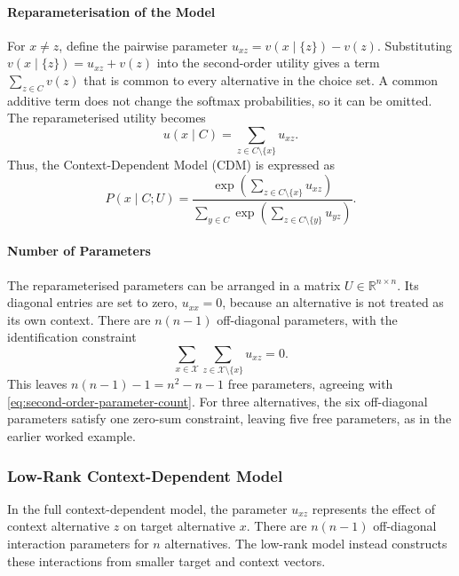 \documentclass[11pt,a4paper]{article}
\newcommand{\R}{\mathbb{R}}
\newcommand{\X}{\mathcal{X}}
\begin{document}
\paragraph{Reparameterisation of the Model}
For $x\neq z$, define the pairwise parameter $u_{xz}=v(x\mid\{z\})-v(z)$. Substituting $v(x\mid\{z\})=u_{xz}+v(z)$ into the second-order utility gives a term $\sum_{z\in C}v(z)$ that is common to every alternative in the choice set. A common additive term does not change the softmax probabilities, so it can be omitted. The reparameterised utility becomes
\begin{equation}
    u(x\mid C)=\sum_{z\in C\setminus\{x\}}u_{xz}.
    \label{eq:cdm-utility}
\end{equation}
Thus, the Context-Dependent Model (CDM) is expressed as
\begin{equation}
    P(x\mid C;U)=
    \frac{\exp\left(\sum_{z\in C\setminus\{x\}}u_{xz}\right)}
    {\displaystyle\sum_{y\in C}\exp\left(\sum_{z\in C\setminus\{y\}}u_{yz}\right)}.
    \label{eq:cdm-probability}
\end{equation}

\paragraph{Number of Parameters}
The reparameterised parameters can be arranged in a matrix $U\in\R^{n\times n}$. Its diagonal entries are set to zero, $u_{xx}=0$, because an alternative is not treated as its own context. There are $n(n-1)$ off-diagonal parameters, with the identification constraint
\begin{equation}
    \sum_{x\in\X}\sum_{z\in\X\setminus\{x\}}u_{xz}=0.
    \label{eq:cdm-identification-constraint}
\end{equation}
This leaves $n(n-1)-1=n^2-n-1$ free parameters, agreeing with \cref{eq:second-order-parameter-count}. For three alternatives, the six off-diagonal parameters satisfy one zero-sum constraint, leaving five free parameters, as in the earlier worked example.

\subsubsection[Low-rank model]{Low-Rank Context-Dependent Model}
\label{sec:low-rank-cdm}

In the full context-dependent model, the parameter $u_{xz}$
represents the effect of context alternative $z$ on target
alternative $x$. There are $n(n-1)$ off-diagonal interaction
parameters for $n$ alternatives. The low-rank model instead
constructs these interactions from smaller target and context
vectors.
\end{document}
